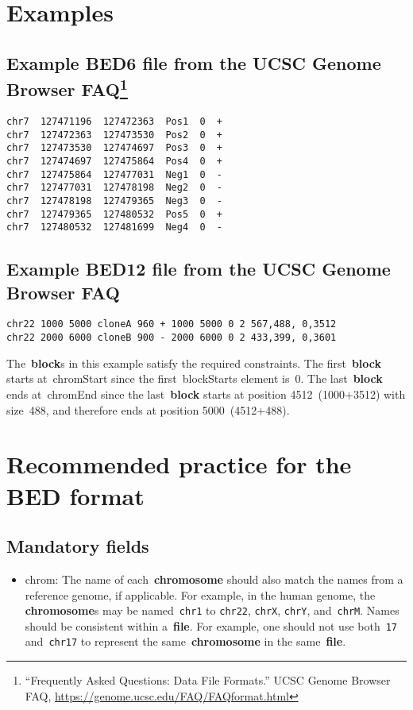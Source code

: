 \documentclass[11pt]{article}
\begin{document}
\section{Examples}

\subsection[title]{Example BED6 file from the \acs{UCSC} Genome Browser FAQ\footnote{``Frequently
    Asked Questions: Data File Formats.'' \ac{UCSC} Genome Browser FAQ,
    \url{https://genome.ucsc.edu/FAQ/FAQformat.html}}}\label{sec:example-bed6}

\begin{verbatim}
chr7  127471196  127472363  Pos1  0  +
chr7  127472363  127473530  Pos2  0  +
chr7  127473530  127474697  Pos3  0  +
chr7  127474697  127475864  Pos4  0  +
chr7  127475864  127477031  Neg1  0  -
chr7  127477031  127478198  Neg2  0  -
chr7  127478198  127479365  Neg3  0  -
chr7  127479365  127480532  Pos5  0  +
chr7  127480532  127481699  Neg4  0  -
\end{verbatim}

\subsection{Example BED12 file from the \acs{UCSC} Genome Browser FAQ}
\begin{verbatim}
chr22 1000 5000 cloneA 960 + 1000 5000 0 2 567,488, 0,3512
chr22 2000 6000 cloneB 900 - 2000 6000 0 2 433,399, 0,3601
\end{verbatim}

The~\textbf{block}s in this example satisfy the required constraints.
The first~\textbf{block} starts at~\textsf{chromStart} since the first~\textsf{blockStarts} element is~0.
The last~\textbf{block} ends at~\textsf{chromEnd} since the last~\textbf{block} starts at position 4512~(1000+3512) with size~488, and therefore ends at position 5000~(4512+488).

\section{Recommended practice for the \acs{BED} format}

\subsection{Mandatory fields}
\begin{itemize}
\item \textsf{chrom}: The name of each~\textbf{chromosome} should also match the names from a reference genome, if applicable.
  For example, in the human genome, the \textbf{chromosome}s may be named~\texttt{chr1} to \texttt{chr22}, \texttt{chrX}, \texttt{chrY}, and~\texttt{chrM}.
  Names should be consistent within a~\textbf{file}.
  For example, one should not use both~\texttt{17} and~\texttt{chr17} to represent the same~\textbf{chromosome} in the same~\textbf{file}.
\end{itemize}
\end{document}
